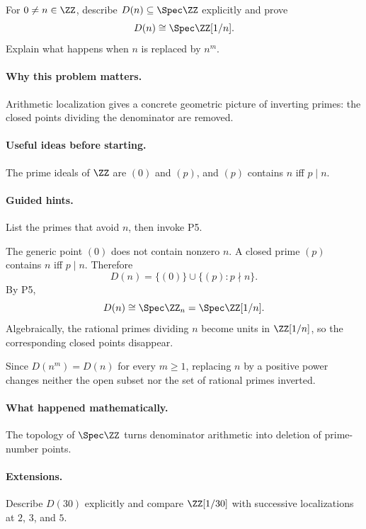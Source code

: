 \begin{problem}
For $0\neq n\in\ZZ$, describe $D(n)\subseteq\Spec\ZZ$ explicitly and prove
\[
D(n)\cong\Spec\ZZ[1/n].
\]
Explain what happens when $n$ is replaced by $n^m$.
\end{problem}

\paragraph{Why this problem matters.}
Arithmetic localization gives a concrete geometric picture of inverting primes: the
closed points dividing the denominator are removed.

\paragraph{Useful ideas before starting.}
The prime ideals of $\ZZ$ are $(0)$ and $(p)$, and $(p)$ contains $n$ iff $p\mid n$.

\paragraph{Guided hints.}
List the primes that avoid $n$, then invoke P5.

\begin{solution}
The generic point $(0)$ does not contain nonzero $n$.  A closed prime $(p)$ contains $n$
iff $p\mid n$.  Therefore
\[
D(n)=\{(0)\}\cup\{(p):p\nmid n\}.
\]
By P5,
\[
D(n)\cong\Spec\ZZ_n=\Spec\ZZ[1/n].
\]
Algebraically, the rational primes dividing $n$ become units in $\ZZ[1/n]$, so the
corresponding closed points disappear.

Since $D(n^m)=D(n)$ for every $m\ge1$, replacing $n$ by a positive power changes neither
the open subset nor the set of rational primes inverted.
\end{solution}

\paragraph{What happened mathematically.}
The topology of $\Spec\ZZ$ turns denominator arithmetic into deletion of prime-number
points.

\paragraph{Extensions.}
Describe $D(30)$ explicitly and compare $\ZZ[1/30]$ with successive localizations at
$2$, $3$, and $5$.
